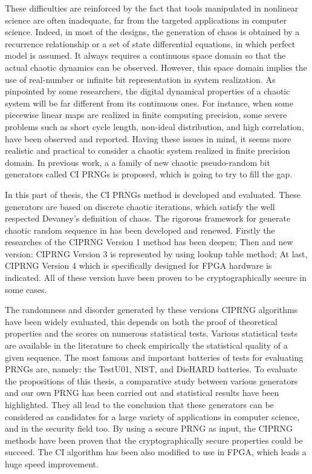 These difficulties are reinforced by the fact that tools manipulated in nonlinear science are often inadequate, far from the targeted applications in computer science. Indeed, in most of the designs, the generation of chaos is obtained by a recurrence relationship or a set of state differential equations, in which perfect model is assumed. It always requires a continuous space domain so that the actual chaotic dynamics can be observed. However, this space domain implies the use of real-number or infinite bit representation in system realization. As pinpointed by some researchers, the digital dynamical properties of a chaotic system will be far different from its continuous ones. For instance, when some piecewise linear maps are realized in finite computing precision, some severe problems such as short cycle length, non-ideal distribution, and high correlation, have been observed and reported. Having these issues in mind, it seems more realistic and practical to consider a chaotic system realized in finite 
precision domain. In previous work, a a family of new chaotic pseudo-random bit generators called CI PRNGs is proposed, which is going to try to fill the gap.

In this part of thesis, the CI PRNGs method is developed and evaluated. These generators are based on discrete chaotic iterations, which satisfy the well respected Devaney's definition of chaos. The rigorous framework for generate chaotic random sequence in \cite{bibtexwangqianxue} has been developed and renewed. Firstly the researches of the CIPRNG Version 1 method has been deepen; Then and new version: CIPRNG Version 3 is represented by using lookup table method; At last, CIPRNG Version 4 which is specifically designed for FPGA hardware is indicated. All of these version have been proven to be cryptographically  secure in some cases.

The randomness and disorder generated by these versions CIPRNG algorithms have been widely evaluated, this depends on both the proof of theoretical properties and the scores on numerous statistical tests.  Various statistical tests are available in the literature to check empirically the statistical quality of a given sequence. The most famous and important batteries of tests for evaluating PRNGs are, namely: the TestU01, NIST, and DieHARD batteries. To evaluate the propositions of this thesis, a comparative study between various generators and our own PRNG has been carried out and statistical results have been highlighted.  They all lead to the conclusion that these generators can be considered as candidates for a large variety of applications in computer science, and in the security field too. By using a secure PRNG as input, the CIPRNG methods have been proven that the cryptographically secure properties could be succeed. The CI algorithm has been also modified to use in FPGA, which leads a huge speed improvement.

